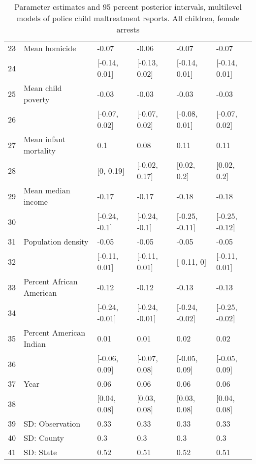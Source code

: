\begin{table}[ht]
\begin{tabular}{rlllll}
  23 & Mean homicide & -0.07 & -0.06 & -0.07 & -0.07 \\ 
  24 &  & [-0.14, 0.01] & [-0.13, 0.02] & [-0.14, 0.01] & [-0.14, 0.01] \\ 
  25 & Mean child poverty & -0.03 & -0.03 & -0.03 & -0.03 \\ 
  26 &  & [-0.07, 0.02] & [-0.07, 0.02] & [-0.08, 0.01] & [-0.07, 0.02] \\ 
  27 & Mean infant mortality & 0.1 & 0.08 & 0.11 & 0.11 \\ 
  28 &  & [0, 0.19] & [-0.02, 0.17] & [0.02, 0.2] & [0.02, 0.2] \\ 
  29 & Mean median income & -0.17 & -0.17 & -0.18 & -0.18 \\ 
  30 &  & [-0.24, -0.1] & [-0.24, -0.1] & [-0.25, -0.11] & [-0.25, -0.12] \\ 
  31 & Population density & -0.05 & -0.05 & -0.05 & -0.05 \\ 
  32 &  & [-0.11, 0.01] & [-0.11, 0.01] & [-0.11, 0] & [-0.11, 0.01] \\ 
  33 & Percent African American & -0.12 & -0.12 & -0.13 & -0.13 \\ 
  34 &  & [-0.24, -0.01] & [-0.24, -0.01] & [-0.24, -0.02] & [-0.25, -0.02] \\ 
  35 & Percent American Indian & 0.01 & 0.01 & 0.02 & 0.02 \\ 
  36 &  & [-0.06, 0.09] & [-0.07, 0.08] & [-0.05, 0.09] & [-0.05, 0.09] \\ 
  37 & Year & 0.06 & 0.06 & 0.06 & 0.06 \\ 
  38 &  & [0.04, 0.08] & [0.03, 0.08] & [0.03, 0.08] & [0.04, 0.08] \\ 
  39 & SD: Observation & 0.33 & 0.33 & 0.33 & 0.33 \\ 
  40 & SD: County & 0.3 & 0.3 & 0.3 & 0.3 \\ 
  41 & SD: State & 0.52 & 0.51 & 0.52 & 0.51 \\ 
   \hline
\end{tabular}
\caption{Parameter estimates and 95 percent posterior intervals, multilevel models of 
             police child maltreatment reports. All children, female arrests} 
\end{table}
